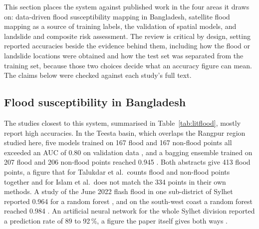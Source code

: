 \documentclass[10pt,a4paper,twocolumn]{article}
\begin{document}
This section places the system against published work in the four areas it draws on: data-driven flood susceptibility mapping in Bangladesh, satellite flood mapping as a source of training labels, the validation of spatial models, and landslide and composite risk assessment. The review is critical by design, setting reported accuracies beside the evidence behind them, including how the flood or landslide locations were obtained and how the test set was separated from the training set, because those two choices decide what an accuracy figure can mean. The claims below were checked against each study's full text.

\subsection{Flood susceptibility in Bangladesh}

The studies closest to this system, summarised in Table~\ref{tab:litflood}, mostly report high accuracies. In the Teesta basin, which overlaps the Rangpur region studied here, five models trained on 167 flood and 167 non-flood points all exceeded an AUC of 0.80 on validation data \citep{islam2021}, and a bagging ensemble trained on 207 flood and 206 non-flood points reached 0.945 \citep{talukdar2020}. Both abstracts give 413 flood points, a figure that for Talukdar et al.\ counts flood and non-flood points together and for Islam et al.\ does not match the 334 points in their own methods. A study of the June 2022 flash flood in one sub-district of Sylhet reported 0.964 for a random forest \citep{islamr2024}, and on the south-west coast a random forest reached 0.984 \citep{adnan2023}. An artificial neural network for the whole Sylhet division reported a prediction rate of 89 to 92\,\%, a figure the paper itself gives both ways \citep{rudra2023}.
\end{document}

